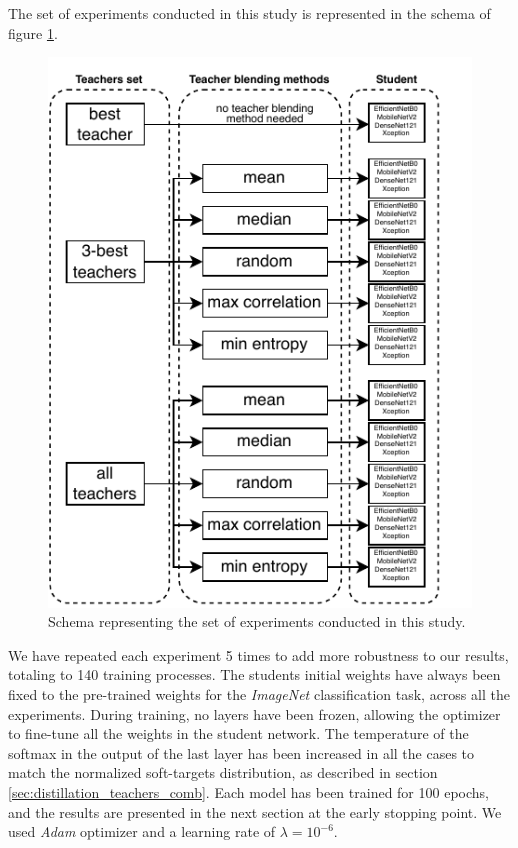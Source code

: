 The set of experiments conducted in this study is represented in the schema of figure \ref{fig:schema}.

\begin{figure}[h!]
\centering
\includegraphics[width=0.9\linewidth]{distillation/images/schema}
\caption{Schema representing the set of experiments conducted in this study.}
\label{fig:schema}
\end{figure}


We have repeated each experiment 5 times to add more robustness to our results, totaling to 140 training processes. The students initial weights have always been fixed to the pre-trained weights for the \textit{ImageNet} classification task, across all the experiments. During training, no layers have been frozen, allowing the optimizer to fine-tune all the weights in the student network. The temperature of the softmax in the output of the last layer has been increased in all the cases to match the normalized soft-targets distribution, as described in section \ref{sec:distillation_teachers_comb}.  Each model has been trained for 100 epochs, and the results are presented in the next section at the early stopping point. We used \textit{Adam} optimizer \autocite{kingma14} and a learning rate of $\lambda = 10^{-6}$.

